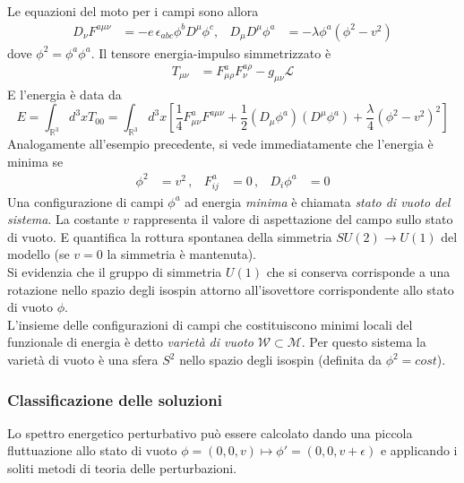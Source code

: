 Le equazioni del moto per i campi sono allora
\begin{equation}\label{eq:nabeqmotion}
   \begin{aligned}
      D_\nu F ^{a\mu\nu} & = -e \, \epsilon_{abc} \phi^b D^\mu \phi^c, &
      D_\mu D^\mu \phi^a & = - \lambda \phi^a (\phi^2 - v^2 )
   \end{aligned}
\end{equation}
dove $\phi^2 = \phi^a\phi^a$. Il tensore energia-impulso simmetrizzato è
\begin{equation}
   \begin{aligned}
      T_{\mu\nu} & =
         F^a _{\mu\rho}F^{a\rho}_\nu - g_{\mu\nu} \mathcal{L}
   \end{aligned}
\end{equation}
E l'energia è data da
\begin{equation}
   E = \int_{\mathbb{R}^3} d^3x T_{00}
     = \int_{\mathbb{R}^3} d^3x \left[ \frac{1}{4} F^a_{\mu\nu}F^{a\mu\nu}
        + \frac{1}{2} (D_\mu \phi^a) (D^\mu \phi^a)
        + \frac{\lambda}{4}(\phi^2 - v^2)^2 \right]
\end{equation}
Analogamente all'esempio precedente, si vede immediatamente che l'energia è minima se
\begin{equation}
   \begin{aligned}
      \phi^2 & = v^2 \, , &
      F^a_{ij} & = 0 \, , &
      D_i \phi^a & = 0
   \end{aligned}
\end{equation}
Una configurazione di campi $\phi^a$ ad energia \emph{minima} è chiamata
\emph{stato di vuoto del sistema}. La costante $v$ rappresenta il valore di
aspettazione del campo sullo stato di vuoto. E quantifica la rottura spontanea
della simmetria $SU(2) \to U(1)$ del modello (se $v=0$ la simmetria è mantenuta).\\
Si evidenzia che il gruppo di simmetria $U(1)$ che si conserva corrisponde a
una rotazione nello spazio degli isospin attorno all'isovettore corrispondente
allo stato di vuoto $\phi$.\\

L'insieme delle configurazioni di campi che costituiscono minimi locali
del funzionale di energia è detto \emph{varietà di vuoto}
$\mathcal{W} \subset \mathcal{M}$. Per questo sistema la varietà di vuoto è una
sfera $S^2$ nello spazio degli isospin (definita da $\phi^2 = cost$).\\
\subsubsection{Classificazione delle soluzioni}
Lo spettro energetico perturbativo può essere calcolato dando una piccola fluttuazione
allo stato di vuoto $\phi = (0,0,v) \mapsto \phi' = (0,0,v + \epsilon)$ e applicando
i soliti metodi di teoria delle perturbazioni.\\

